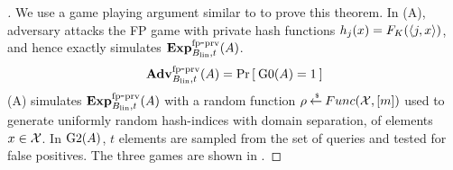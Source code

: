 \begin{proof}[]
We use a game playing argument similar to  to prove this theorem. In (A), adversary attacks the FP game with private hash functions $h_j(x) = F_K(\langle j,x \rangle) $, and hence exactly simulates $\mathrm{\mathbf{Exp}}^{\mathrm{fp\mbox{-}prv}}_{B_\mathrm{lin},t}(A)$.
\begin{equation}
\mathrm{\mathbf{Adv}}^{\mathrm{fp\mbox{-}prv}}_{B_\mathrm{lin},t}(A) = \Pr\left[\: \text{G0}(A)=1 \:\right]\label{eq:0T2}
\end{equation}
\noindent
{}(A) simulates $\mathrm{\mathbf{Exp}}^{\mathrm{fp\mbox{-}prv}}_{B_\mathrm{lin},t}(A)$ with a random function $\rho {\:\stackrel{{\scriptscriptstyle \hspace{0.2em}\$}} {\leftarrow}\:} Func({\cal X},[m])$ used to generate uniformly random  hash-indices with domain separation, of elements $x \in {\cal X}$. In $\text{G2}(A)$, $t$ elements are sampled from the set of queries and tested for false positives.  The three games are shown in .


\end{proof}
